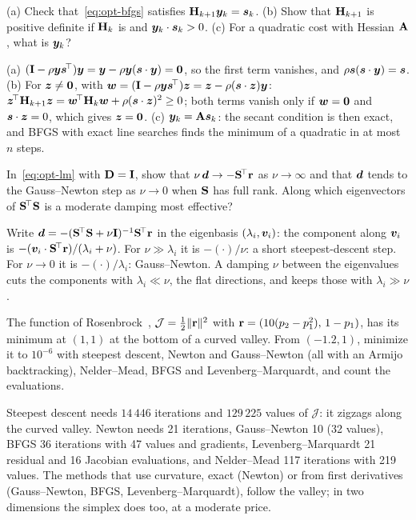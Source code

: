 \label{exo:opt-secant}
%
(a) Check that~\eqref{eq:opt-bfgs} satisfies $\mathbf{H}_{k+1}\bm{y}_k=\bm{s}_k$. (b) Show that
$\mathbf{H}_{k+1}$ is positive definite if $\mathbf{H}_k$ is and $\bm{y}_k\cdot\bm{s}_k>0$. (c) For a
quadratic cost with Hessian $\mathbf{A}$, what is $\bm{y}_k$?
\begin{solution}
(a) $(\mathbf{I}-\rho\bm{y}\bm{s}^{\!\top})\bm{y}=\bm{y}-\rho\bm{y}(\bm{s}\cdot\bm{y})=\bm{0}$, so the first term
vanishes, and $\rho\bm{s}(\bm{s}\cdot\bm{y})=\bm{s}$. (b) For $\bm{z}\neq\bm{0}$, with
$\bm{w}=(\mathbf{I}-\rho\bm{y}\bm{s}^{\!\top})\bm{z}=\bm{z}-\rho(\bm{s}\cdot\bm{z})\bm{y}$:
$\bm{z}^{\!\top}\mathbf{H}_{k+1}\bm{z}=\bm{w}^{\!\top}\mathbf{H}_k\bm{w}+\rho(\bm{s}\cdot\bm{z})^2\ge0$; both terms vanish only if
$\bm{w}=\bm{0}$ and $\bm{s}\cdot\bm{z}=0$, which gives $\bm{z}=\bm{0}$. (c) $\bm{y}_k=\mathbf{A}\bm{s}_k$:
the secant condition is then exact, and BFGS with exact line searches finds the
minimum of a quadratic in at most $n$ steps.
\end{solution}

\label{exo:opt-lm}
%
In~\eqref{eq:opt-lm} with $\mathbf{D}=\mathbf{I}$, show that $\nu\,\bm{d}\to-\mathbf{S}^{\!\top}\mathbf{r}$ as
$\nu\to\infty$ and that $\bm{d}$ tends to the Gauss--Newton step as $\nu\to0$ when
$\mathbf{S}$ has full rank. Along which eigenvectors of $\mathbf{S}^{\!\top}\mathbf{S}$ is a moderate
damping most effective?
\begin{solution}
Write $\bm{d}=-(\mathbf{S}^{\!\top}\mathbf{S}+\nu\mathbf{I})^{-1}\mathbf{S}^{\!\top}\mathbf{r}$ in the eigenbasis
$(\lambda_i,\bm{v}_i)$: the component along $\bm{v}_i$ is
$-(\bm{v}_i\cdot\mathbf{S}^{\!\top}\mathbf{r})/(\lambda_i+\nu)$. For $\nu\gg\lambda_i$ it is
$-(\cdot)/\nu$: a short steepest-descent step. For $\nu\to0$ it is $-(\cdot)/\lambda_i$:
Gauss--Newton. A damping $\nu$ between the eigenvalues cuts the components with
$\lambda_i\ll\nu$, the flat directions, and keeps those with $\lambda_i\gg\nu$.
\end{solution}


\label{exo:opt-rosen}
%
The function of Rosenbrock~\cite{Rosenbrock1960},
$\mathcal J=\tfrac12\lVert \mathbf{r}\rVert^2$ with $\mathbf{r}=(10(p_2-p_1^2),\,1-p_1)$, has its minimum
at $(1,1)$ at the bottom of a curved valley. From $(-1.2,1)$, minimize it to
$10^{-6}$ with steepest descent, Newton and Gauss--Newton (all with an Armijo
backtracking), Nelder--Mead, BFGS and Levenberg--Marquardt, and count the
evaluations.
\begin{solution}
Steepest descent needs $14\,446$ iterations and $129\,225$ values of $\mathcal J$: it
zigzags along the curved valley. Newton needs 21 iterations, Gauss--Newton 10
(32 values), BFGS 36 iterations with 47 values and gradients, Levenberg--Marquardt
21 residual and 16 Jacobian evaluations, and Nelder--Mead 117 iterations with 219
values. The methods that use curvature, exact (Newton) or from first derivatives
(Gauss--Newton, BFGS, Levenberg--Marquardt), follow the valley; in two dimensions
the simplex does too, at a moderate price.

\end{solution}

